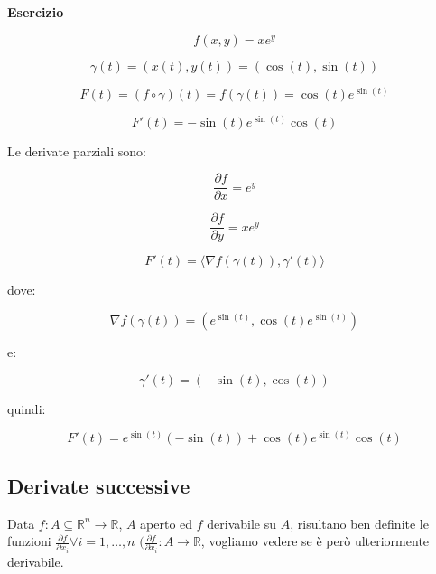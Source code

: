 \documentclass[../appunti-analisi.tex]{subfiles}
\begin{document}
\textbf{Esercizio} 

\[
    f(x,y)= x e ^{y}
\]

\[
    \gamma(t) = (x(t), y(t)) = (\cos (t) , \sin (t))
\]

\[
    F(t) = (f \circ \gamma) (t) = f(\gamma(t)) = \cos (t) e ^{\sin (t)}
\]

\[
    F'(t) = -\sin (t) e ^{\sin (t)} \cos (t)
\]

Le derivate parziali sono:

\[
    \frac{\partial f}{\partial x} = e ^{y} 
\]

\[
    \frac{\partial f}{\partial y} = x e ^{y}
\]

\[
    F'(t) = \langle \nabla f(\gamma(t)), \gamma'(t) \rangle  
\]

dove:

\[
    \nabla f(\gamma(t)) = (e ^{\sin (t)}, \cos (t) e ^{\sin (t)})
\]

e:

\[
    \gamma'(t) = (-\sin (t), \cos (t))
\]

quindi:

\[
    F'(t) = e ^{\sin(t)} (- \sin (t)) + \cos (t) e ^{\sin (t)}\cos (t)
\]


\newpage

\subsection{Derivate successive}

Data $f: A \subseteq \mathbb{R}^{n} \rightarrow \mathbb{R}$, $A$ aperto ed $f$ derivabile su $A$, risultano ben definite le funzioni $\frac{\partial f}{\partial x_i} \forall i=1,\ldots,n$ $(\frac{\partial f}{\partial x_i}: A \rightarrow \mathbb{R}$, vogliamo vedere se è però ulteriormente derivabile.

\end{document}

